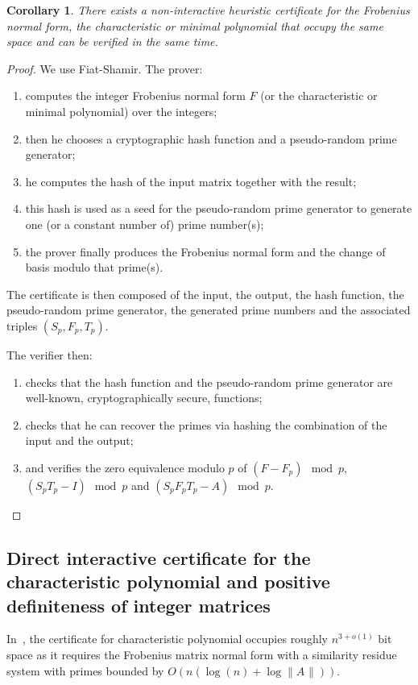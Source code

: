 \documentclass{article}
\newtheorem{corollary}{Corollary}
\newcommand{\bigO}[1]{\ensuremath{O(#1)}\xspace}
\newcommand{\lognormA}{\log\| A\mspace{1mu} \|}
\begin{document}
\begin{corollary} There exists a {\em non-interactive heuristic certificate} for
  the Frobenius normal form, the characteristic or minimal polynomial that
  occupy the same space and can be verified in the same time.
\end{corollary}
\begin{proof} We use Fiat-Shamir. The prover:
  \begin{enumerate}
  \item
  computes the integer Frobenius normal form $F$ (or the characteristic or
  minimal polynomial) over the integers;
  \item 
  then he chooses a cryptographic hash function and a pseudo-random prime 
  generator; 
  \item 
  he computes the hash of the input matrix together with the result;
  \item 
  this hash is used as a seed for the pseudo-random prime generator to
  generate one (or a constant number of) prime number(s);
  \item 
  the prover finally produces the Frobenius normal form and the change of basis
  modulo that prime(s).
  \end{enumerate}
  The certificate is then composed of the input, the output, the hash function,
  the pseudo-random prime generator, the generated prime numbers and the
  associated triples $(S_p,F_p,T_p)$.

  The verifier then:
  \begin{enumerate}
  \item checks that the hash function and the pseudo-random prime generator
    are well-known, cryptographically secure, functions;
  \item checks that he can recover the primes via hashing the combination of the
    input and the output;
  \item and verifies the zero equivalence modulo $p$ of $(F-F_p)\mod p$,
    $(S_pT_p-I)\mod p$ and $(S_p F_p T_p-A)\mod p$.
  \end{enumerate}
\end{proof}

\subsection{Direct interactive certificate for the
  characteristic polynomial and positive definiteness of integer
  matrices}\label{ssec:charpoly}
In~\cite{Kaltofen:2011:quadcert}, the certificate for characteristic
polynomial occupies roughly $n^{3+o(1)}$ bit space as it requires the
Frobenius matrix normal form with a similarity residue system with primes
bounded by $\bigO{ n(\log(n)+\lognormA) }$.
\end{document}

